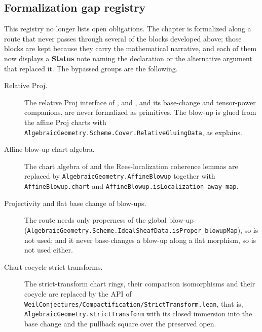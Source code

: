 \subsection{Formalization gap registry}
\label{sec:nagata-gap-registry}

This registry no longer lists open obligations.  The chapter is formalized
along a route that never passes through several of the blocks developed
above; those blocks are kept because they carry the mathematical narrative,
and each of them now displays a \textbf{Status} note naming the declaration
or the alternative argument that replaced it.  The bypassed groups are the
following.

\begin{description}
  \item[Relative Proj.]  The relative Proj interface of
    , 
    and , and its base-change
    and tensor-power companions, are never formalized as primitives.  The blow-up
    is glued from the affine Proj charts with
    \texttt{AlgebraicGeometry.Scheme.Cover.RelativeGluingData}, as
     explains.

  \item[Affine blow-up chart algebra.]  The chart algebra of
     and the Rees-localization coherence
    lemmas are replaced by \texttt{AlgebraicGeometry.AffineBlowup} together
    with \texttt{AffineBlowup.chart} and
    \texttt{AffineBlowup.isLocalization\_away\_map}.

  \item[Projectivity and flat base change of blow-ups.]  The route needs only
    properness of the global blow-up
    (\texttt{AlgebraicGeometry.Scheme.IdealSheafData.isProper\_blowupMap}),
    so  is not used; and it never
    base-changes a blow-up along a flat morphism, so
     is not used either.

  \item[Chart-cocycle strict transforms.]  The strict-transform chart rings,
    their comparison isomorphisms and their cocycle are replaced by the API
    of \texttt{WeilConjectures/Compactification/StrictTransform.lean}, that
    is, \texttt{AlgebraicGeometry.strictTransform} with its closed immersion
    into the base change and the pullback square over the preserved open.


\end{description}

